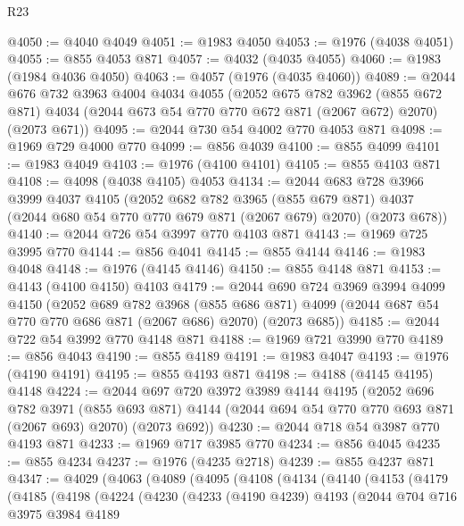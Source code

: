 \begin{lexlean}{R23}
\begin{coremodule}
@4050 := @4040 @4049
@4051 := @1983 @4050
@4053 := @1976 (@4038 @4051)
@4055 := @855 @4053 @871
@4057 := @4032 (@4035 @4055)
@4060 := @1983 (@1984 @4036 @4050)
@4063 := @4057 (@1976 (@4035 @4060))
@4089 := @2044
    @676
    @732
    @3963
    @4004
    @4034
    @4055
    (@2052
      @675
      @782
      @3962
      (@855 @672 @871)
      @4034
      (@2044 @673 @54 @770 @770 @672 @871 (@2067 @672) @2070)
      (@2073 @671))
@4095 := @2044 @730 @54 @4002 @770 @4053 @871
@4098 := @1969 @729 @4000 @770
@4099 := @856 @4039
@4100 := @855 @4099
@4101 := @1983 @4049
@4103 := @1976 (@4100 @4101)
@4105 := @855 @4103 @871
@4108 := @4098 (@4038 @4105) @4053
@4134 := @2044
    @683
    @728
    @3966
    @3999
    @4037
    @4105
    (@2052
      @682
      @782
      @3965
      (@855 @679 @871)
      @4037
      (@2044 @680 @54 @770 @770 @679 @871 (@2067 @679) @2070)
      (@2073 @678))
@4140 := @2044 @726 @54 @3997 @770 @4103 @871
@4143 := @1969 @725 @3995 @770
@4144 := @856 @4041
@4145 := @855 @4144
@4146 := @1983 @4048
@4148 := @1976 (@4145 @4146)
@4150 := @855 @4148 @871
@4153 := @4143 (@4100 @4150) @4103
@4179 := @2044
    @690
    @724
    @3969
    @3994
    @4099
    @4150
    (@2052
      @689
      @782
      @3968
      (@855 @686 @871)
      @4099
      (@2044 @687 @54 @770 @770 @686 @871 (@2067 @686) @2070)
      (@2073 @685))
@4185 := @2044 @722 @54 @3992 @770 @4148 @871
@4188 := @1969 @721 @3990 @770
@4189 := @856 @4043
@4190 := @855 @4189
@4191 := @1983 @4047
@4193 := @1976 (@4190 @4191)
@4195 := @855 @4193 @871
@4198 := @4188 (@4145 @4195) @4148
@4224 := @2044
    @697
    @720
    @3972
    @3989
    @4144
    @4195
    (@2052
      @696
      @782
      @3971
      (@855 @693 @871)
      @4144
      (@2044 @694 @54 @770 @770 @693 @871 (@2067 @693) @2070)
      (@2073 @692))
@4230 := @2044 @718 @54 @3987 @770 @4193 @871
@4233 := @1969 @717 @3985 @770
@4234 := @856 @4045
@4235 := @855 @4234
@4237 := @1976 (@4235 @2718)
@4239 := @855 @4237 @871
@4347 := @4029
    (@4063
      (@4089
        (@4095
          (@4108
            (@4134
              (@4140
                (@4153
                  (@4179
                    (@4185
                      (@4198
                        (@4224
                          (@4230
                            (@4233
                              (@4190 @4239)
                              @4193
                              (@2044
                                @704
                                @716
                                @3975
                                @3984
                                @4189

\end{coremodule}
\end{lexlean}
